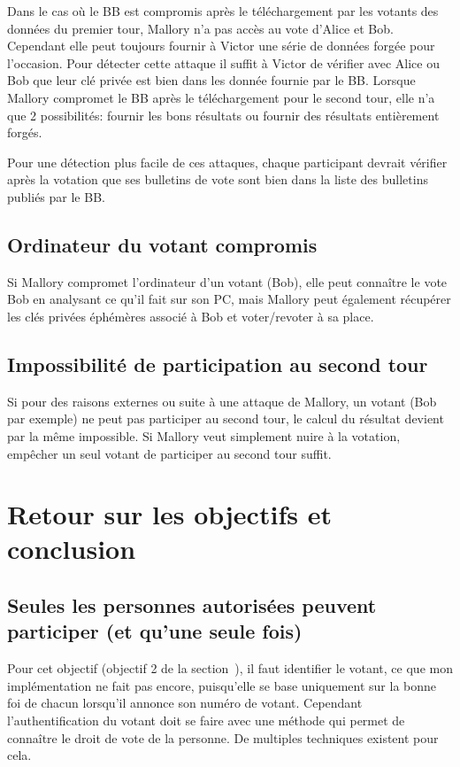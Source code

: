 \documentclass[../report]{subfiles}
\begin{document}
Dans le cas où le BB est compromis après le téléchargement par les votants des données du premier tour, Mallory n'a pas accès au vote
d'Alice et Bob.
Cependant elle peut toujours fournir à Victor une série de données forgée pour l'occasion. 
Pour détecter cette attaque il suffit à Victor de vérifier avec Alice ou Bob que leur clé privée est bien dans les donnée fournie par le BB. 
Lorsque Mallory compromet le BB après le téléchargement pour le second tour, elle n'a que 2 possibilités: fournir les bons résultats 
ou fournir des résultats entièrement forgés.

Pour une détection plus facile de ces attaques, chaque participant devrait vérifier après la votation que ses bulletins de vote sont bien dans la liste
des bulletins publiés par le BB.

\section{Ordinateur du votant compromis}

Si Mallory compromet l'ordinateur d'un votant (Bob), elle peut connaître le vote Bob en analysant ce qu'il fait sur son PC, 
mais Mallory peut également récupérer les clés privées éphémères associé à Bob et voter/revoter à sa place.

\section{Impossibilité de participation au second tour}

Si pour des raisons externes ou suite à une attaque de Mallory, un votant (Bob par exemple) ne peut pas participer au second tour, le 
calcul du résultat devient par la même impossible. Si Mallory veut simplement nuire à la votation, empêcher un seul votant 
de participer au second tour suffit.

\chapter{Retour sur les objectifs et conclusion}

\section{Seules les personnes autorisées peuvent participer (et qu'une seule fois)}

Pour cet objectif (objectif 2 de la section~),
il faut identifier le votant, ce que mon implémentation ne fait pas encore, puisqu'elle se base 
uniquement sur la bonne foi de chacun lorsqu'il annonce son numéro de votant.
Cependant l'authentification du votant doit se faire avec une méthode qui permet de connaître
le droit de vote de la personne. De multiples techniques existent pour cela.
\end{document}

